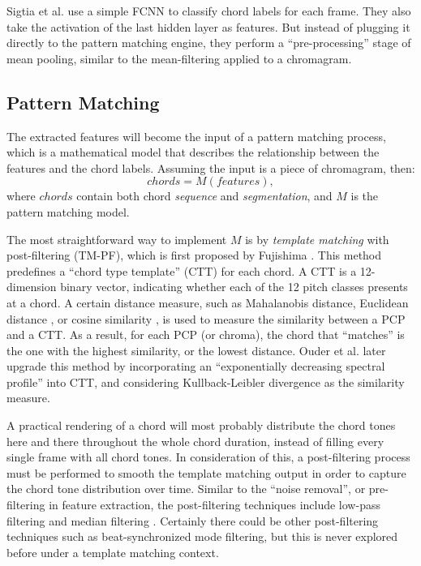 Sigtia et al. \cite{sigtia2015audio} use a simple FCNN to classify chord labels for each frame. They also take the activation of the last hidden layer as features. But instead of plugging it directly to the pattern matching engine, they perform a ``pre-processing'' stage of mean pooling, similar to the mean-filtering applied to a chromagram.


\subsection{Pattern Matching} \label{sec:2-pm}
The extracted features will become the input of a pattern matching process, which is a mathematical model that describes the relationship between the features and the chord labels. Assuming the input is a piece of chromagram, then:
\begin{equation}
\mathit{chords = M(features)},
\end{equation}
where $chords$ contain both chord {\it sequence} and {\it segmentation}, and $M$ is the pattern matching model.

The most straightforward way to implement $M$ is by {\it template matching} with post-filtering (TM-PF), which is first proposed by Fujishima \cite{fujishima1999realtime}. This method predefines a ``chord type template'' (CTT) for each chord. A CTT is a 12-dimension binary vector, indicating whether each of the 12 pitch classes presents at a chord. A certain distance measure, such as Mahalanobis distance\cite{reinhard2008enhancing}, Euclidean distance \cite{zenz2007automatic}, or cosine similarity \cite{harte2005automatic}, is used to measure the similarity between a PCP and a CTT. As a result, for each PCP (or chroma), the chord that ``matches'' is the one with the highest similarity, or the lowest distance. Ouder et al. \cite{oudre2009template} later upgrade this method by incorporating an ``exponentially decreasing spectral profile'' \cite{gomez2006tonal_a} into CTT, and considering Kullback-Leibler divergence \cite{kullback1951information} as the similarity measure.

A practical rendering of a chord will most probably distribute the chord tones here and there throughout the whole chord duration, instead of filling every single frame with all chord tones. In consideration of this, a post-filtering process must be performed to smooth the template matching output in order to capture the chord tone distribution over time. Similar to the ``noise removal'', or pre-filtering \cite{cho2014improved} in feature extraction, the post-filtering techniques include low-pass filtering \cite{oudre2009template} and median filtering \cite{harte2005automatic,humphrey2012rethinking}. Certainly there could be other post-filtering techniques such as beat-synchronized mode filtering, but this is never explored before under a template matching context.


